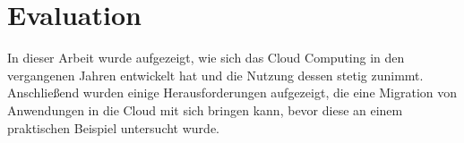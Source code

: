 \section{Evaluation}
In dieser Arbeit wurde aufgezeigt, wie sich das Cloud Computing in den vergangenen Jahren entwickelt hat und die Nutzung dessen stetig zunimmt. Anschließend wurden einige Herausforderungen aufgezeigt, die eine Migration von Anwendungen in die Cloud mit sich bringen kann, bevor diese an einem praktischen Beispiel untersucht wurde. \pagebreak
